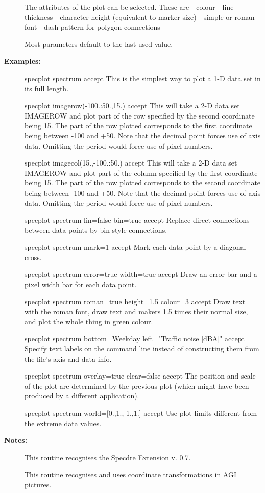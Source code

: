 \begin{description}
\begin{terminalv}
   The attributes of the plot can be selected. These are
   -  colour
   -  line thickness
   -  character height (equivalent to marker size)
   -  simple or roman font
   -  dash pattern for polygon connections

   Most parameters default to the last used value.
\end{terminalv}

\item [\textbf{Examples:}]
\begin{terminalv}
specplot spectrum accept
   This is the simplest way to plot a 1-D data set in its full
   length.

specplot imagerow(-100.:50.,15.) accept
   This will take a 2-D data set IMAGEROW and plot part of the
   row specified by the second coordinate being 15. The part of
   the row plotted corresponds to the first coordinate being
   between -100 and +50. Note that the decimal point forces use of
   axis data. Omitting the period would force use of pixel
   numbers.

specplot imagecol(15.,-100.:50.) accept
   This will take a 2-D data set IMAGEROW and plot part of the
   column specified by the first coordinate being 15. The part of
   the row plotted corresponds to the second coordinate being
   between -100 and +50. Note that the decimal point forces use of
   axis data. Omitting the period would force use of pixel
   numbers.

specplot spectrum lin=false bin=true accept
   Replace direct connections between data points by bin-style
   connections.

specplot spectrum mark=1 accept
   Mark each data point by a diagonal cross.

specplot spectrum error=true width=true accept
   Draw an error bar and a pixel width bar for each data point.

specplot spectrum roman=true height=1.5 colour=3 accept
   Draw text with the roman font, draw text and makers 1.5 times
   their normal size, and plot the whole thing in green colour.

specplot spectrum bottom=Weekday left="Traffic noise [dBA]" accept
   Specify text labels on the command line instead of constructing
   them from the file's axis and data info.

specplot spectrum overlay=true clear=false accept
   The position and scale of the plot are determined by the
   previous plot (which might have been produced by a different
   application).

specplot spectrum world=[0.,1.,-1.,1.] accept
   Use plot limits different from the extreme data values.
\end{terminalv}

\item [\textbf{Notes:}]
This routine recognises the Specdre Extension v. 0.7.

This routine recognises and uses coordinate transformations in
AGI pictures.
\end{description}
